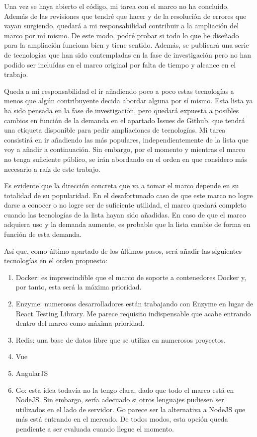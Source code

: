 Una vez se haya abierto el código, mi tarea con el marco no ha concluido. Además de las revisiones que tendré que hacer y de la resolución de errores que vayan surgiendo, quedará a mi responsabilidad contribuir a la ampliación del marco por mí mismo. De este modo, podré probar si todo lo que he diseñado para la ampliación funciona bien y tiene sentido. Además, se publicará una serie de tecnologías que han sido contempladas en la fase de investigación pero no han podido ser incluídas en el marco original por falta de tiempo y alcance en el trabajo.

Queda a mi responsabilidad el ir añadiendo poco a poco estas tecnologías a menos que algún contribuyente decida abordar alguna por sí mismo. Esta lista ya ha sido pensada en la fase de investigación, pero quedará expuesta a posibles cambios en función de la demanda en el apartado Issues de Github, que tendrá una etiqueta disponible para pedir ampliaciones de tecnologías. Mi tarea consistirá en ir añadiendo las más populares, independientemente de la lista que voy a añadir a continuación. Sin embargo, por el momento y mientras el marco no tenga suficiente público, se irán abordando en el orden en que considero más necesario a raíz de este trabajo.

Es evidente que la dirección concreta que va a tomar el marco depende en su totalidad de su popularidad. En el desafortunado caso de que este marco no logre darse a conocer o no logre ser de suficiente utilidad, el marco quedará completo cuando las tecnologías de la lista hayan sido añadidas. En caso de que el marco adquiera uso y la demanda aumente, es probable que la lista cambie de forma en función de esta demanda.

Así que, como último apartado de los últimos pasos, será añadir las siguientes tecnologías en el orden propuesto:
\begin{enumerate}
  \item Docker: es imprescindible que el marco de soporte a contenedores Docker y, por tanto, esta será la máxima prioridad.
  \item Enzyme: numerosos desarrolladores están trabajando con Enzyme en lugar de React Testing Library. Me parece requisito indispensable que acabe entrando dentro del marco como máxima prioridad.
  \item Redis: una base de datos libre que se utiliza en numerosos proyectos.
  \item Vue
  \item AngularJS
  \item Go: esta idea todavía no la tengo clara, dado que todo el marco está en NodeJS. Sin embargo, sería adecuado si otros lenguajes pudiesen ser utilizados en el lado de servidor. Go parece ser la alternativa a NodeJS que más está entrando en el mercado. De todos modos, esta opción queda pendiente a ser evaluada cuando llegue el momento.
\end{enumerate}
